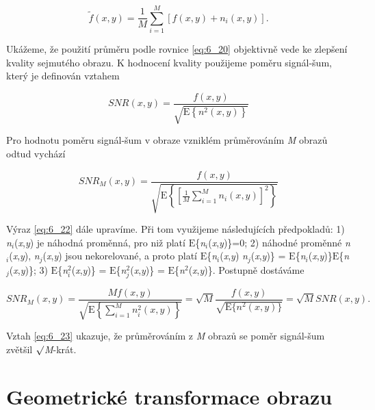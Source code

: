 \begin{equation} \label{eq:6_20}
    \tilde{f}(x, y) = \frac{1}{M} \sum\limits_{i=1}^{M} [ f(x, y) + n_i(x, y) ].
\end{equation}

Ukážeme, že použití průměru podle rovnice \eqref{eq:6_20} objektivně vede ke zlepšení kvality sejmutého   obrazu. K hodnocení kvality použijeme poměru signál-šum, který je definován vztahem

\begin{equation} \label{eq:6_21}
    SNR(x, y) = \frac{f(x, y)}{\sqrt{\mathrm{E}\left\{ n^2(x, y) \right\}}}
\end{equation}

Pro hodnotu poměru signál-šum v obraze vzniklém průměrováním \textit{M} obrazů odtud vychází

\begin{equation} \label{eq:6_22}
    SNR_M(x, y) = \frac{f(x, y)}{\sqrt{\mathrm{E}\left\{ \left[ \frac{1}{M} \sum\limits_{i=1}^{M} n_i(x, y) \right]^2 \right\}}}
\end{equation}

Výraz \eqref{eq:6_22} dále upravíme. Při tom využijeme následujících předpokladů: 1) \textit{n}$_i$(\textit{x},\textit{y}) je náhodná proměnná, pro niž platí $\mathrm{E}$\{\textit{n}$_i$(\textit{x},\textit{y})\}=0; 2) náhodné proměnné \textit{n}$_i$(\textit{x},\textit{y}), \textit{n}$_j$(\textit{x},\textit{y}) jsou nekorelované, a proto platí $\mathrm{E}$\{\textit{n}$_i$(\textit{x},\textit{y}) \textit{n}$_j$(\textit{x},\textit{y})\} = $\mathrm{E}$\{\textit{n}$_i$(\textit{x},\textit{y})\}$\mathrm{E}$\{\textit{n}$_j$(\textit{x},\textit{y})\}; 3) $\mathrm{E}$\{\textit{n}$_i^2$(\textit{x},\textit{y})\} = $\mathrm{E}$\{\textit{n}$_j^2$(\textit{x},\textit{y})\} = $\mathrm{E}$\{\textit{n}$^2$(\textit{x},\textit{y})\}. Postupně dostáváme

\begin{equation} \label{eq:6_23} 
    SNR_{M} \left(x, y\right) = \frac{Mf\left(x, y\right)}{\sqrt{\mathrm{E}\left\{\sum\limits_{i=1}^{M}n_{i}^{2} \left(x,y\right) \right\}} } = \sqrt{M} \frac{f(x, y)}{\sqrt{\mathrm{E}\{n^2(x, y)\}}} = \sqrt{M} SNR(x, y).
\end{equation}

Vztah \eqref{eq:6_23} ukazuje, že průměrováním z \textit{M} obrazů se poměr signál-šum zvětšil $\surd$\textit{M}-krát.

\section*{Geometrické transformace obrazu}

